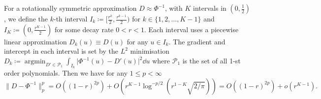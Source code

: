 \documentclass[manuscript,review]{acmart}
\DeclareMathOperator*{\argmin}{argmin} %
\begin{document}
\begin{theorem}
\label{thm:piecewise_linear_approximation_error}
For a rotationally symmetric approximation $ D \approx \Phi^{-1}$, with $ K $ intervals in $ (0, \tfrac{1}{2}) $, we define the $ k $-th interval $ I_k \coloneqq [\tfrac{r^k}{2}, \tfrac{r^{k-1}}{2})$ for $ k \in \{1,2,\ldots, K-1\} $ and $ I_K \coloneqq (0, \tfrac{r^{K-1}}{2}) $ for some decay rate $ 0 < r < 1 $. Each interval uses a piecewise linear approximation $ D_k(u) \equiv D(u) $ for any $ u \in I_k $. The gradient and intercept in each interval is set by the $ L^2 $ minimisation $ D_k \coloneqq \argmin_{D' \in \mathcal{P}_1} \int_{I_k}\lvert\Phi^{-1}(u) - D'(u)\rvert^2 \dd{u} $ where $ \mathcal{P}_1 $  is the set of all 1-st order polynomials. Then we have for any $ 1 \leq p < \infty  $
\begin{equation*}
\lVert D - \Phi^{-1}\rVert_p^p 
= O((1-r)^{2p}) +
O(r^{K-1} {\log}^{-p/2}(r^{1-K}\sqrt{2/\pi}))  = O((1-r)^{2p}) +
o(r^{K-1}).
\end{equation*}
\end{theorem}
\end{document}
